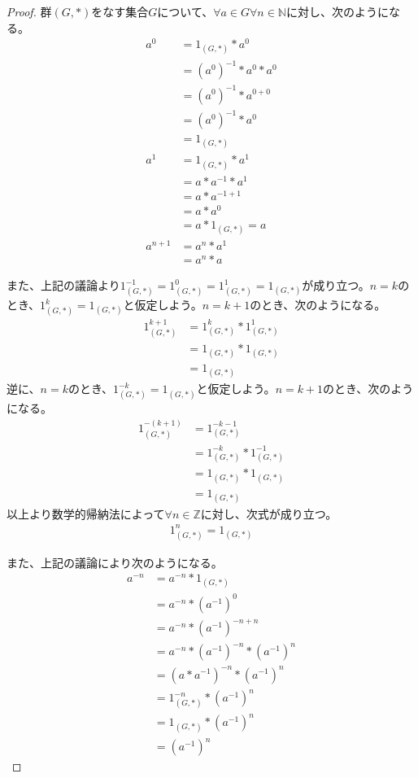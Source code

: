 \documentclass[dvipdfmx]{jsarticle}
\begin{document}
\begin{proof}
群$(G,*)$をなす集合$G$について、$\forall a \in G\forall n \in \mathbb{N}$に対し、次のようになる。
\begin{align*}
a^{0} &= 1_{(G,*)}*a^{0}\\
&= \left( a^{0} \right)^{- 1}*a^{0}*a^{0}\\
&= \left( a^{0} \right)^{- 1}*a^{0 + 0}\\
&= \left( a^{0} \right)^{- 1}*a^{0}\\
&= 1_{(G,*)}\\
a^{1} &= 1_{(G,*)}*a^{1}\\
&= a*a^{- 1}*a^{1}\\
&= a*a^{- 1 + 1}\\
&= a*a^{0}\\
&= a*1_{(G,*)} = a\\
a^{n + 1} &= a^{n}*a^{1}\\
&= a^{n}*a
\end{align*}\par
また、上記の議論より$1_{(G,*)}^{- 1} = 1_{(G,*)}^{0} = 1_{(G,*)}^{1} = 1_{(G,*)}$が成り立つ。$n = k$のとき、$1_{(G,*)}^{k} = 1_{(G,*)}$と仮定しよう。$n = k + 1$のとき、次のようになる。
\begin{align*}
1_{(G,*)}^{k + 1} &= 1_{(G,*)}^{k}*1_{(G,*)}^{1}\\
&= 1_{(G,*)}*1_{(G,*)}\\
&= 1_{(G,*)}
\end{align*}
逆に、$n = k$のとき、$1_{(G,*)}^{- k} = 1_{(G,*)}$と仮定しよう。$n = k + 1$のとき、次のようになる。
\begin{align*}
1_{(G,*)}^{- (k + 1)} &= 1_{(G,*)}^{- k - 1}\\
&= 1_{(G,*)}^{- k}*1_{(G,*)}^{- 1}\\
&= 1_{(G,*)}*1_{(G,*)}\\
&= 1_{(G,*)}
\end{align*}
以上より数学的帰納法によって$\forall n \in \mathbb{Z}$に対し、次式が成り立つ。
\begin{align*}
1_{(G,*)}^{n} = 1_{(G,*)}
\end{align*}\par
また、上記の議論により次のようになる。
\begin{align*}
a^{- n} &= a^{- n}*1_{(G,*)}\\
&= a^{- n}*\left( a^{- 1} \right)^{0}\\
&= a^{- n}*\left( a^{- 1} \right)^{- n + n}\\
&= a^{- n}*\left( a^{- 1} \right)^{- n}*\left( a^{- 1} \right)^{n}\\
&= \left( a*a^{- 1} \right)^{- n}*\left( a^{- 1} \right)^{n}\\
&= 1_{(G,*)}^{- n}*\left( a^{- 1} \right)^{n}\\
&= 1_{(G,*)}*\left( a^{- 1} \right)^{n}\\
&= \left( a^{- 1} \right)^{n}
\end{align*}
\end{proof}
\end{document}
